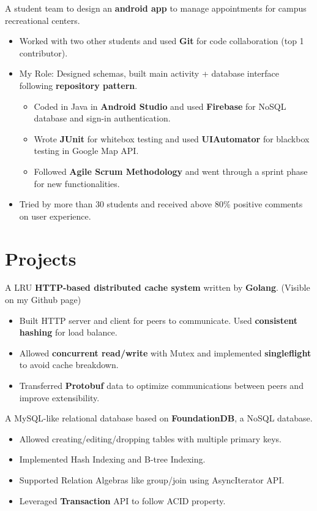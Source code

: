 \documentclass{resume}
\begin{document}
  A student team to design an \textbf{android app} to manage appointments for campus recreational centers.
\begin{itemize}
  \item Worked with two other students and used \textbf{Git} for code collaboration (top 1 contributor).
  \item My Role: Designed schemas, built main activity + database interface following \textbf{repository pattern}.
  \begin{itemize}
    \item Coded in Java in \textbf{Android Studio} and used \textbf{Firebase} for NoSQL database and sign-in authentication. 
    \item Wrote \textbf{JUnit} for whitebox testing and used \textbf{UIAutomator} for blackbox testing in Google Map API.
    \item Followed \textbf{Agile Scrum Methodology} and went through a sprint phase for new functionalities.
  \end{itemize}
  \item Tried by more than 30 students and received above 80\% positive comments on user experience.
\end{itemize}

\section{Projects}
  A LRU \textbf{HTTP-based distributed cache system} written by \textbf{Golang}. (Visible on my Github page)
\begin{itemize}
  \item Built HTTP server and client for peers to communicate. Used \textbf{consistent hashing} for load balance.
  \item Allowed \textbf{concurrent read/write} with Mutex and implemented \textbf{singleflight} to avoid cache breakdown.
  \item Transferred \textbf{Protobuf} data to optimize communications between peers and improve extensibility.
\end{itemize}

  A MySQL-like relational database based on \textbf{FoundationDB}, a NoSQL database.
\begin{itemize}
  \item Allowed creating/editing/dropping tables with multiple primary keys.
  \item Implemented Hash Indexing and B-tree Indexing.
  \item Supported Relation Algebras like group/join using AsyncIterator API.
  \item Leveraged \textbf{Transaction} API to follow ACID property.
\end{itemize}
\end{document}
